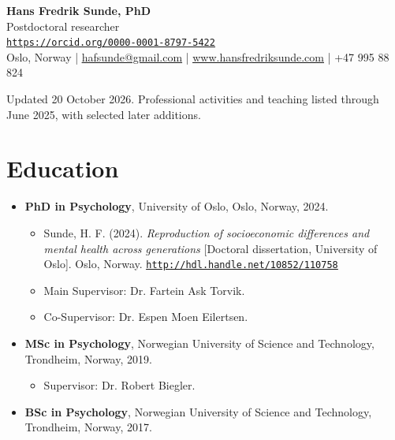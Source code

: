 \documentclass[10pt,a4paper]{article}
\let\cvlarge\LARGE
\renewcommand{\LARGE}{\cvlarge\cvheadingfont}%
\let\cvhref\href
\renewcommand{\href}[2]{\cvhref{#1}{\underline{#2}}}%
\renewcommand{\url}[1]{\href{#1}{\nolinkurl{#1}}}%
\begin{document}
\thispagestyle{plain}
\begin{center}
{\LARGE\textbf{Hans Fredrik Sunde, PhD}}\\[4pt]
Postdoctoral researcher\\[3pt]
\url{https://orcid.org/0000-0001-8797-5422}\\[3pt]
Oslo, Norway | \href{mailto:hafsunde@gmail.com}{hafsunde@gmail.com} |
\href{https://www.hansfredriksunde.com}{www.hansfredriksunde.com} | +47 995 88 824
\end{center}

Updated 20 October 2026. Professional activities and teaching listed through June 2025, with selected later additions.

\section*{Education}
\begin{itemize}
\item \textbf{PhD in Psychology}, University of Oslo, Oslo, Norway, 2024.
  \begin{itemize}
  \item Sunde, H. F. (2024). \textit{Reproduction of socioeconomic differences and mental health across generations} [Doctoral dissertation, University of Oslo]. Oslo, Norway. \url{http://hdl.handle.net/10852/110758}
  \item Main Supervisor: Dr. Fartein Ask Torvik.
  \item Co-Supervisor: Dr. Espen Moen Eilertsen.
  \end{itemize}
\item \textbf{MSc in Psychology}, Norwegian University of Science and Technology, Trondheim, Norway, 2019.
  \begin{itemize}
  \item Supervisor: Dr. Robert Biegler.
  \end{itemize}
\item \textbf{BSc in Psychology}, Norwegian University of Science and Technology, Trondheim, Norway, 2017.
\end{itemize}
\end{document}
